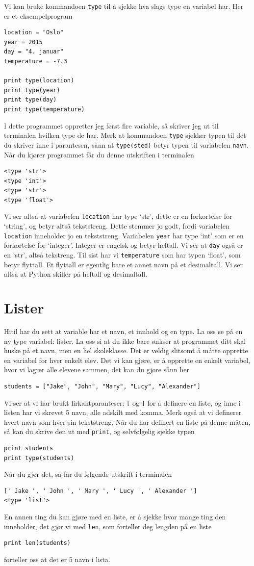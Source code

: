 \documentclass[a4paper, 11pt, notitlepage]{article}
\begin{document}
Vi kan bruke kommandoen \verb+type+ til å sjekke hva slags type en variabel har. Her er et eksempelprogram
\begin{lstlisting}
location = "Oslo"
year = 2015
day = "4. januar"
temperature = -7.3

print type(location)
print type(year)
print type(day)
print type(temperature)
\end{lstlisting}
I dette programmet oppretter jeg først fire variable, så skriver jeg ut til terminalen hvilken type de har. Merk at kommandoen \verb+type+ sjekker typen til det du skriver inne i parantesen, sånn at \verb+type(sted)+ betyr typen til variabelen \verb+navn+. Når du kjører programmet får du denne utskriften i terminalen
\begin{lstlisting}
<type 'str'>
<type 'int'>
<type 'str'>
<type 'float'>
\end{lstlisting}
Vi ser altså at variabelen \verb+location+ har type `str', dette er en forkortelse for `string', og betyr altså tekststreng. Dette stemmer jo godt, fordi variabelen \verb+location+ inneholder jo en tekststreng. Variabelen \verb+year+ har type `int' som er en forkortelse for `integer'. Integer er engelsk og betyr heltall. Vi ser at \verb+day+ også er en `str', altså tekstreng. Til sist har vi \verb+temperature+ som har typen `float', som betyr flyttall. Et flyttall er egentlig bare et annet navn på et desimaltall. Vi ser altså at Python skiller på heltall og desimaltall.

\section*{Lister}

Hitil har du sett at variable har et navn, et innhold og en type. La oss se på en ny type variabel: lister. La oss si at du ikke bare ønkser at programmet ditt skal huske på et navn, men en hel skoleklasse. Det er veldig slitsomt å måtte opprette en variabel for hver enkelt elev. Det vi kan gjøre, er å opprette en enkelt variabel, hvor vi lagrer alle elevene sammen, det kan du gjøre sånn her
\begin{lstlisting}
students = ["Jake", "John", "Mary", "Lucy", "Alexander"]
\end{lstlisting}
Vi ser at vi har brukt firkantparanteser: \verb+[+ og \verb+]+ for å definere en liste, og inne i listen har vi skrevet 5 navn, alle adskilt med komma. Merk også at vi definerer hvert navn som hver sin tekststreng. Når du har definert en liste på denne måten, så kan du skrive den ut med \verb+print+, og selvfølgelig sjekke typen
\begin{lstlisting}
print students
print type(students)
\end{lstlisting}
Når du gjør det, så får du følgende utskrift i terminalen
\begin{verbatim}
[' Jake ', ' John ', ' Mary ', ' Lucy ', ' Alexander ']
<type 'list'>
\end{verbatim}
En annen ting du kan gjøre med en liste, er å sjekke hvor mange ting den inneholder, det gjør vi med \verb+len+, som forteller deg lengden på en liste
\begin{lstlisting}
print len(students)
\end{lstlisting}
forteller oss at det er 5 navn i lista.
\end{document}
